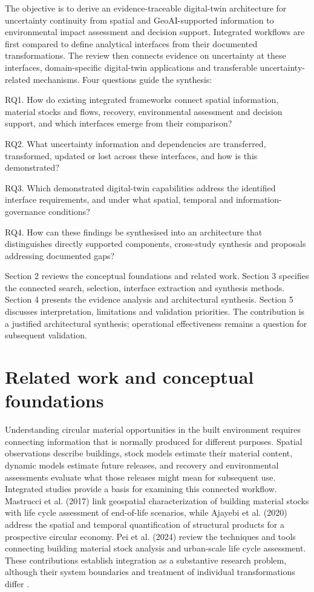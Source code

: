 The objective is to derive an evidence-traceable digital-twin architecture for uncertainty continuity from spatial and GeoAI-supported information to environmental impact assessment and decision support. Integrated workflows are first compared to define analytical interfaces from their documented transformations. The review then connects evidence on uncertainty at these interfaces, domain-specific digital-twin applications and transferable uncertainty-related mechanisms. Four questions guide the synthesis:

RQ1. How do existing integrated frameworks connect spatial information, material stocks and flows, recovery, environmental assessment and decision support, and which interfaces emerge from their comparison?

RQ2. What uncertainty information and dependencies are transferred, transformed, updated or lost across these interfaces, and how is this demonstrated?

RQ3. Which demonstrated digital-twin capabilities address the identified interface requirements, and under what spatial, temporal and information-governance conditions?

RQ4. How can these findings be synthesised into an architecture that distinguishes directly supported components, cross-study synthesis and proposals addressing documented gaps?

Section 2 reviews the conceptual foundations and related work. Section 3 specifies the connected search, selection, interface extraction and synthesis methods. Section 4 presents the evidence analysis and architectural synthesis. Section 5 discusses interpretation, limitations and validation priorities. The contribution is a justified architectural synthesis; operational effectiveness remains a question for subsequent validation.

\section{Related work and conceptual foundations}
Understanding circular material opportunities in the built environment requires connecting information that is normally produced for different purposes. Spatial observations describe buildings, stock models estimate their material content, dynamic models estimate future releases, and recovery and environmental assessments evaluate what those releases might mean for subsequent use. Integrated studies provide a basis for examining this connected workflow. Mastrucci et al. (2017) link geospatial characterization of building material stocks with life cycle assessment of end-of-life scenarios, while Ajayebi et al. (2020) address the spatial and temporal quantification of structural products for a prospective circular economy. Pei et al. (2024) review the techniques and tools connecting building material stock analysis and urban-scale life cycle assessment. These contributions establish integration as a substantive research problem, although their system boundaries and treatment of individual transformations differ \citep{I36,I37,I35}.

